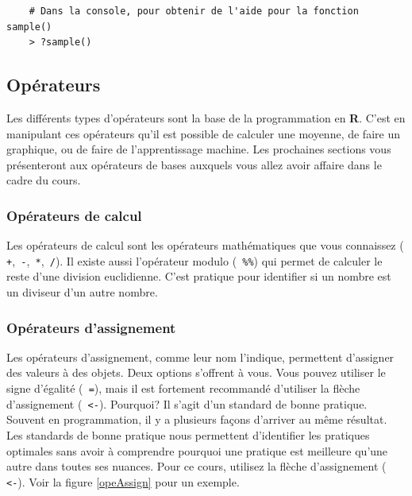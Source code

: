 \documentclass[10.5pt,a4paper]{article}
\newcommand{\rcode}[1]{\texttt{\color{rstudio} #1}}
\begin{document}
  \begin{lstlisting}
    # Dans la console, pour obtenir de l'aide pour la fonction sample()
    > ?sample()
  \end{lstlisting}
  
  \subsection{Opérateurs}
  Les différents types d'opérateurs sont la base de la programmation en \textbf{R}. C'est en manipulant ces opérateurs qu'il est possible de calculer une moyenne, de faire un graphique, ou de faire de l'apprentissage machine. Les prochaines sections vous présenteront aux opérateurs de bases auxquels vous allez avoir affaire dans le cadre du cours. 
  
    \subsubsection{Opérateurs de calcul}
    Les opérateurs de calcul sont les opérateurs mathématiques que vous connaissez (\rcode{+},\rcode{-},\rcode{*},\rcode{/}). Il existe aussi l'opérateur modulo (\rcode{\%\%}) qui permet de calculer le reste d'une division euclidienne. C'est pratique pour identifier si un nombre est un diviseur d'un autre nombre.  

      
    \subsubsection{Opérateurs d'assignement}
    Les opérateurs d'assignement, comme leur nom l'indique, permettent d'assigner des valeurs à des objets. Deux options s'offrent à vous. Vous pouvez utiliser le signe d'égalité (\rcode{=}), mais il est fortement recommandé d'utiliser la flèche d'assignement (\rcode{<-}). Pourquoi? Il s'agit d'un standard de bonne pratique. Souvent en programmation, il y a plusieurs façons d'arriver au même résultat. Les standards de bonne pratique nous permettent d'identifier les pratiques optimales sans avoir à comprendre pourquoi une pratique est meilleure qu'une autre dans toutes ses nuances. Pour ce cours, utilisez la flèche d'assignement (\rcode{<-}). Voir la figure \ref{opeAssign} pour un exemple.
    
\end{document}
